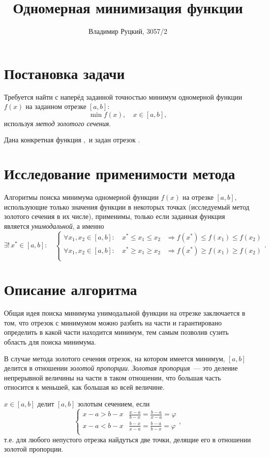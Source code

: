 \documentclass[10pt,a4paper,titlepage]{article}
\title{Одномерная минимизация функции}
\author{Владимир Руцкий, 3057/2}
\begin{document}
\maketitle
\thispagestyle{empty}

\section{Постановка задачи}
Требуется найти с наперёд заданной точностью минимум одномерной функции $f(x)$ на заданном отрезке $[a, b]$:
$$ \min f(x), \quad x \in [a, b], $$
используя \textit{метод золотого сечения}.

Дана конкретная функция $,$ и задан отрезок $.$

\section{Исследование применимости метода}
Алгоритмы поиска минимума одномерной функции $f(x)$ на отрезке $[a, b]$, 
использующие только значения функции в некоторых точках 
(исследуемый метод золотого сечения в их числе), применимы, только
если заданная функция является \textit{унимодальной}, а именно
$$ \exists ! \, x^* \in [a, b]: \quad
\begin{cases}
  \forall x_1, x_2 \in [a,b]: \quad x^* \leqslant x_1 \leqslant x_2 & \Rightarrow f(x^*) \leqslant f(x_1) \leqslant f(x_2) \\
  \forall x_1, x_2 \in [a,b]: \quad x^* \geqslant x_1 \geqslant x_2 & \Rightarrow f(x^*) \geqslant f(x_1) \geqslant f(x_2) \\
\end{cases}.
$$

\section{Описание алгоритма}
Общая идея поиска минимума унимодальной функции на отрезке заключается в том, 
что отрезок с минимумом можно разбить на части и гарантировано определить в какой части находится минимум,
тем самым позволив сузить область для поиска минимума.

В случае метода золотого сечения отрезок, на котором имеется минимум, $[a,b]$ делится в отношении 
\textit{золотой пропорции}.
\textit{Золотая пропорция}~--- это деление непрерывной величины на части в таком отношении, 
что большая часть относится к меньшей, как большая ко всей величине.

$x \in [a,b]$ делит $[a,b]$ золотым сечением, если 
$$
\begin{cases}
  x - a > b - x &  \frac{x - a}{b - x} = \frac{b - a}{x - a} = \varphi \\
  x - a < b - x &  \frac{b - x}{x - a} = \frac{b - a}{b - x} = \varphi \\
\end{cases},
$$
т.е. для любого непустого отрезка найдуться две точки, делящие его в отношении золотой пропорции.
\end{document}
